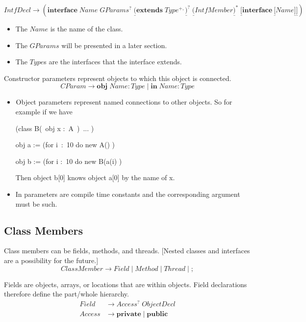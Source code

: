 \documentclass{article}%
\begin{document}
\[
IntfDecl\rightarrow\left(  \mathbf{interface}\;Name\;GParams^{?}%
\;\underline{(}\mathbf{extends}\;Type^{+,}\underline{)}^{?}\;\underline{(}%
IntfMember\underline{)}^{\ast}\;\underline{[}\mathbf{interface~}%
\underline{[}Name\underline{]}\underline{]}\right)
\]


\begin{itemize}
\item The $Name$ is the name of the class.

\item The $GParams$ will be presented in a later section.

\item The $Type$s are the interfaces that the interface extends.
\end{itemize}

Constructor parameters represent objects to which this object is connected.%
\[
CParam\rightarrow\mathbf{obj}\;Name:Type\mid\mathbf{in}\;Name:Type
\]


\begin{itemize}
\item $_{{}}$Object parameters represent named connections to other objects.
So for example if we have

\begin{code}
(class B(\ obj x :\ A\ )\ ... )

obj a := (for i\ :\ 10 do new A() )

obj b := (for i :\ 10 do new B(a(i) )
\end{code}

Then object \textsf{b[0]} knows object \textsf{a[0]} by the name of \textsf{x}.

\item In parameters are compile time constants and the corresponding argument
must be such.
\end{itemize}

\subsection{Class Members}

Class members can be fields, methods, and threads. [Nested classes and
interfaces are a possibility for the future.]%
\[
ClassMember\rightarrow Field\mid Method\mid Thread\mid{};
\]


Fields are objects, arrays, or locations that are within objects. Field
declarations therefore define the part/whole hierarchy.
\begin{align*}
Field  &  \rightarrow Access^{?}\;ObjectDecl\\
Access  &  \rightarrow\mathbf{private}\mid\mathbf{public}%
\end{align*}
\end{document}
